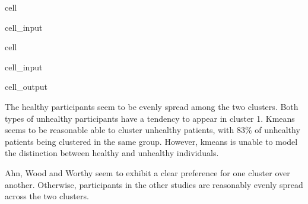 \documentclass[letterpaper,10pt,english]{jupyterBook}
\begin{document}
\begin{sphinxuseclass}{cell}
\begin{sphinxVerbatimInput}
\begin{sphinxuseclass}{cell_input}
\begin{sphinxVerbatim}[commandchars=\\\{\}]
\end{sphinxVerbatim}

\end{sphinxuseclass}\end{sphinxVerbatimInput}

\end{sphinxuseclass}
\begin{sphinxuseclass}{cell}\begin{sphinxVerbatimInput}

\begin{sphinxuseclass}{cell_input}
\begin{sphinxVerbatim}[commandchars=\\\{\}]
   
\end{sphinxVerbatim}

\end{sphinxuseclass}\end{sphinxVerbatimInput}
\begin{sphinxVerbatimOutput}

\begin{sphinxuseclass}{cell_output}
\noindent{}

\end{sphinxuseclass}\end{sphinxVerbatimOutput}

\end{sphinxuseclass}
\sphinxAtStartPar
The healthy participants seem to be evenly spread among the two clusters. Both types of unhealthy participants have a tendency to appear in cluster 1. K\sphinxhyphen{}means seems to be reasonable able to cluster unhealthy patients, with 83\% of unhealthy patients being clustered in the same group. However, k\sphinxhyphen{}means is unable to model the distinction between healthy and unhealthy individuals.

\sphinxAtStartPar
Ahn, Wood and Worthy seem to exhibit a clear preference for one cluster over another. Otherwise, participants in the other studies are reasonably evenly spread across the two clusters.
\end{document}
